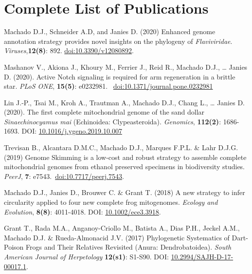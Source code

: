 
\section{Complete List of Publications}

	{
		\setlength{\parskip}{.5em}\renewcommand{\baselinestretch}{2.0}
		\begin{hangparas}{.25in}{1}

        Machado D.J., Schneider A.D, and Janies D. (2020) Enhanced genome annotation strategy provides novel insights on the phylogeny of \emph{Flaviviridae}. \emph{Viruses},\textbf{12(8)}: 892. \href{https://www.mdpi.com/1999-4915/12/8/892}{doi:10.3390/v12080892}.
	
	    Mashanov V., Akiona J., Khoury M., Ferrier J., Reid R., Machado D.J., … Janies D. (2020). Active Notch signaling is required for arm regeneration in a brittle star. \emph{PLoS ONE}, \textbf{15(5)}: e0232981. ~\href{https://doi.org/10.1371/journal.pone.0232981}{doi:10.1371/journal.pone.0232981}
	    
	    Lin J.-P., Tsai M., Kroh A., Trautman A., Machado D.J., Chang L., … Janies D. (2020). The first complete mitochondrial genome of the sand dollar \emph{Sinaechinocyamus mai} (Echinoidea: Clypeasteroida). \emph{Genomics}, \textbf{112(2)}: 1686-1693. DOI: \href{https://doi.org/10.1016/j.ygeno.2019.10.007}{10.1016/j.ygeno.2019.10.007}
	
		Trevisan B., Alcantara D.M.C., Machado D.J., Marques F.P.L. \& Lahr D.J.G. (2019) Genome Skimming is a low-cost and robust strategy to assemble complete mitochondrial genomes from ethanol preserved specimens in biodiversity studies. \emph{PeerJ}, \textbf{7}: e7543.~\href{https://doi.org/10.7717/peerj.7543}{doi:10.7717/peerj.7543}.

		Machado D.J., Janies D., Brouwer C. \& Grant T. (2018) A new strategy to infer circularity applied to four new complete frog mitogenomes. \emph{Ecology and Evolution}, \textbf{8(8)}: 4011-4018. DOI: \href{http://doi.wiley.com/10.1002/ece3.3918}{10.1002/ece3.3918}.

		Grant T., Rada M.A., Anganoy-Criollo M., Batista A., Dias P.H., Jeckel A.M., Machado D.J. \& Rueda-Almonacid J.V. (2017) Phylogenetic Systematics of Dart-Poison Frogs and Their Relatives Revisited (Anura: Dendrobatoidea). \emph{South American Journal of Herpetology} \textbf{12(s1)}: S1-S90. DOI: \href{http://www.bioone.org/doi/10.2994/SAJH-D-17-00017.1}{10.2994/SAJH-D-17-00017.1}.


\end{hangparas}}
